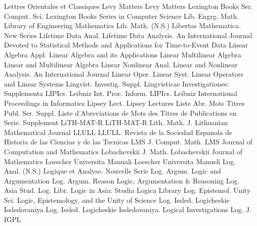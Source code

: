 {Lettres Orientales et Classiques}
{Levy Matters}
{Levy Matters}
{Lexington Books Ser. Comput. Sci.}
{Lexington Books Series in Computer Science}
{Lib. Engrg. Math.}
{Library of Engineering Mathematics}
{Lib. Math. (N.S.)}
{Libertas Mathematica. New Series}
{Lifetime Data Anal.}
{Lifetime Data Analysis. An International Journal Devoted to Statistical Methods and Applications for Time-to-Event Data}
{Linear Algebra Appl.}
{Linear Algebra and its Applications}
{Linear Multilinear Algebra}
{Linear and Multilinear Algebra}
{Linear Nonlinear Anal.}
{Linear and Nonlinear Analysis. An International Journal}
{Linear Oper. Linear Syst.}
{Linear Operators and Linear Systems}
{Lingvist. Investig. Suppl.}
{Lingvisticae Investigationes: Supplementa}
{LIPIcs. Leibniz Int. Proc. Inform.}
{LIPIcs. Leibniz International Proceedings in Informatics}
{Lipsey Lect.}
{Lipsey Lectures}
{Liste Abr. Mots Titres Publ. Ser. Suppl.}
{Liste d'Abreviations de Mots des Titres de Publications en Serie. Supplement}
{LiTH-MAT-R}
{LiTH-MAT-R}
{Lith. Math. J.}
{Lithuanian Mathematical Journal}
{LLULL}
{LLULL. Revista de la Sociedad Espanola de Historia de las Ciencias y de las Tecnicas}
{LMS J. Comput. Math.}
{LMS Journal of Computation and Mathematics}
{Lobachevskii J. Math.}
{Lobachevskii Journal of Mathematics}
{Loescher Universita Manuali}
{Loescher Universita Manueli}
{Log. Anal. (N.S.)}
{Logique et Analyse. Nouvelle Serie}
{Log. Argum.}
{Logic and Argumentation}
{Log. Argum. Reason}
{Logic, Argumentation & Reasoning}
{Log. Asia Stud. Log. Libr.}
{Logic in Asia: Studia Logica Library}
{Log. Epistemol. Unity Sci.}
{Logic, Epistemology, and the Unity of Science}
{Log. Issled.}
{Logicheskie Issledovaniya}
{Log. Issled.}
{Logicheskie Issledovaniya. Logical Investigations}
{Log. J. IGPL}
